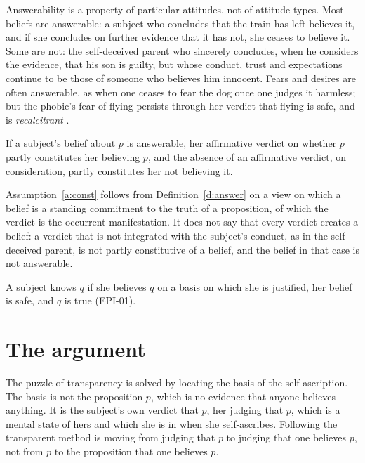 \documentclass{situationist-preprint}
\begin{document}
Answerability is a property of particular attitudes, not of attitude types. Most beliefs are answerable: a subject who concludes that the train has left believes it, and if she concludes on further evidence that it has not, she ceases to believe it. Some are not: the self-deceived parent who sincerely concludes, when he considers the evidence, that his son is guilty, but whose conduct, trust and expectations continue to be those of someone who believes him innocent. Fears and desires are often answerable, as when one ceases to fear the dog once one judges it harmless; but the phobic's fear of flying persists through her verdict that flying is safe, and is \emph{recalcitrant} \citep{Gendler2008}.

\begin{assumption}[Constitution]\label{a:const}
If a subject's belief about $p$ is answerable, her affirmative verdict on whether $p$ partly constitutes her believing $p$, and the absence of an affirmative verdict, on consideration, partly constitutes her not believing it.
\end{assumption}

Assumption~\ref{a:const} follows from Definition~\ref{d:answer} on a view on which a belief is a standing commitment to the truth of a proposition, of which the verdict is the occurrent manifestation. It does not say that every verdict creates a belief: a verdict that is not integrated with the subject's conduct, as in the self-deceived parent, is not partly constitutive of a belief, and the belief in that case is not answerable.

\begin{principle}[Knowledge]\label{p:know}
A subject knows $q$ if she believes $q$ on a basis on which she is justified, her belief is safe, and $q$ is true (EPI-01).
\end{principle}

\section{The argument}

The puzzle of transparency is solved by locating the basis of the self-ascription. The basis is not the proposition $p$, which is no evidence that anyone believes anything. It is the subject's own verdict that $p$, her judging that $p$, which is a mental state of hers and which she is in when she self-ascribes. Following the transparent method is moving from judging that $p$ to judging that one believes $p$, not from $p$ to the proposition that one believes $p$.
\end{document}
